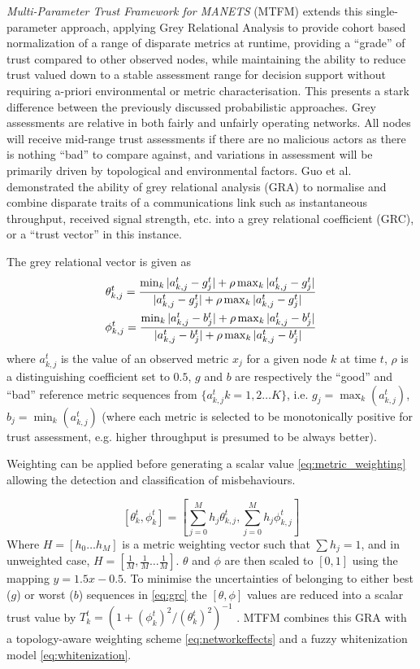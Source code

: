 \textit{Multi-Parameter Trust Framework for MANETS} (MTFM) extends this single-parameter approach, applying Grey Relational Analysis \cite{Zuo1995} to provide cohort based normalization of a range of disparate metrics at runtime, providing a “grade” of trust compared to other observed nodes, while maintaining the ability to reduce trust valued down to a stable assessment range for decision support without requiring a-priori environmental or metric characterisation. This presents a stark difference between the previously discussed probabilistic approaches. Grey assessments are relative in both fairly and unfairly operating networks. All nodes will receive mid-range trust assessments if there are no malicious actors as there is nothing ``bad'' to compare against, and variations in assessment will be primarily driven by topological and environmental factors.
Guo et al. \cite{Guo11} demonstrated the ability of grey relational analysis (GRA) \cite{Zuo1995} to normalise and combine disparate traits of a communications link such as instantaneous throughput, received signal strength, etc. into a grey relational coefficient (GRC), or a ``trust vector'' in this instance.

The grey relational vector is given as
%
\begin{align}
\label{eq:grc}
\theta_{k,j}^t = \frac{\min_k|a_{k,j}^t - g_j^t| + \rho \max_k|a_{k,j}^t-g_j^t|}{|a_{k,j}^t-g_j^t| + \rho \max_k|a_{k,j}^t-g_j^t|} \\
\phi_{k,j}^t = \frac{\min_k|a_{k,j}^t - b_j^t| + \rho \max_k|a_{k,j}^t-b_j^t|}{|a_{k,j}^t-b_j^t| + \rho \max_k|a_{k,j}^t-b_j^t|} \notag 
\end{align}
%
where $a_{k,j}^t$ is the value of an observed metric $x_j$ for a given node $k$ at time $t$, $\rho$ is a distinguishing coefficient set to $0.5$, $g$ and $b$ are respectively the ``good'' and ``bad'' reference metric sequences from $\{a_{k,j}^t k=1,2\dots K\}$, i.e. $g_j=\max_k({a_{k,j}^t})$,  $b_j=\min_k({a_{k,j}^t})$ (where each metric is selected to be monotonically positive for trust assessment, e.g. higher throughput is presumed to be always better). 

Weighting can be applied before generating a scalar value \eqref{eq:metric_weighting} allowing the detection and classification of misbehaviours.

%
\begin{equation}
\label{eq:metric_weighting}
[\theta_k^t, \phi_k^t] = \left[\sum_{j=0}^M h_j \theta_{k,j}^t,\sum_{j=0}^M h_j \phi_{k,j}^t \right]
\end{equation}
%
Where $H=[h_0\dots h_M]$ is a metric weighting vector such that $\sum h_j = 1$, and in unweighted case, $H=[\frac{1}{M},\frac{1}{M}\dots\frac{1}{M}]$.
$\theta$ and $\phi$ are then scaled to $[0,1]$ using the mapping $y = 1.5 x - 0.5$.
To minimise the uncertainties of belonging to either best ($g$) or worst ($b$) sequences in \eqref{eq:grc} the $[\theta,\phi]$ values are reduced into a scalar trust value by $T_k^t = ({1+{(\phi_k^t)^2}/{(\theta_k^t)^2}})^{-1}$ \cite{Hong2010}.
MTFM combines this GRA with a topology-aware weighting scheme \eqref{eq:networkeffects} and a fuzzy whitenization model \eqref{eq:whitenization}. 

